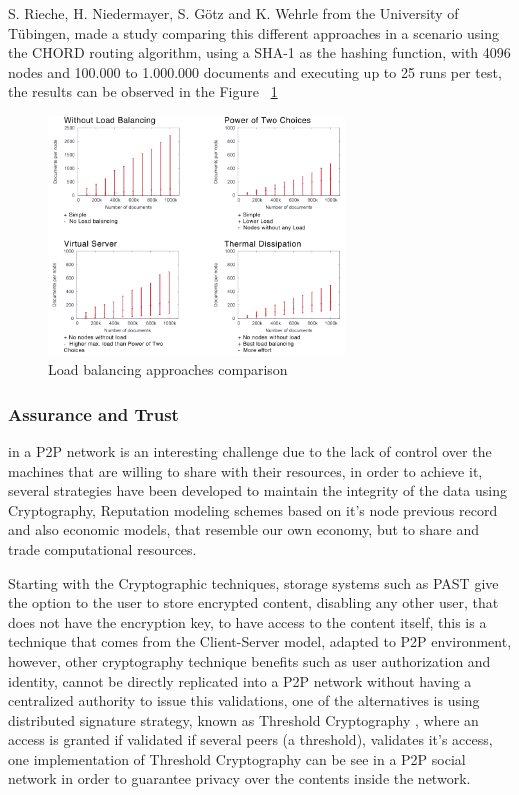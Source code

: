 S. Rieche, H. Niedermayer, S. Götz and  K. Wehrle from the University of Tübingen, made a study comparing this different approaches in a scenario using the CHORD routing algorithm, using a SHA-1 as the hashing function, with 4096 nodes and 100.000 to 1.000.000 documents and executing up to 25 runs per test, the results can be observed in the Figure ~\ref{fig:lbcomp}

\begin{figure}[h!]
    \centering
    \includegraphics[width=0.7\textwidth]{img/lb.jpg}
    \caption{Load balancing approaches comparison}
    \label{fig:lbcomp}
\end{figure}

\subsubsection{Assurance and Trust}\label{par:Assurance and Trust}

in a P2P network is an interesting challenge due to the lack of control over the machines that are willing to share with their resources, in order to achieve it, several strategies have been developed to maintain the integrity of the data using Cryptography, Reputation modeling schemes based on it's node previous record and also economic models, that resemble our own economy, but to share and trade computational resources.

Starting with the Cryptographic techniques, storage systems such as PAST give the option to the user to store encrypted content, disabling any other user, that does not have the encryption key, to have access to the content itself, this is a technique that comes from the Client-Server model, adapted to P2P environment, however, other cryptography technique benefits such as user authorization and identity, cannot be directly replicated into a P2P network without having a centralized authority to issue this validations, one of the alternatives is using distributed signature strategy, known as Threshold Cryptography \cite{Desmedt;1998}, where an access is granted if validated if several peers (a threshold), validates it's access, one implementation of Threshold Cryptography can be see in a P2P social network\cite{Afify} in order to guarantee privacy over the contents inside the network. 

